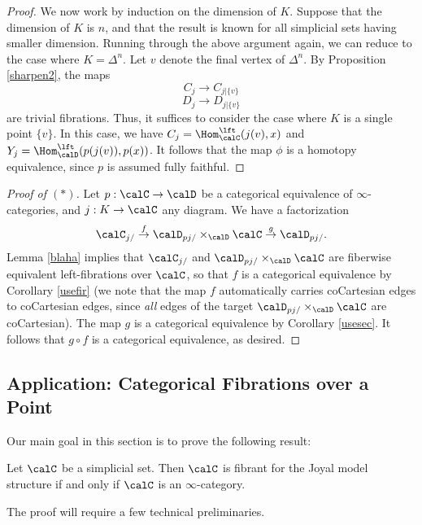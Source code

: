 \begin{proof}
We now work by induction on the dimension of $K$. Suppose that the dimension of $K$ is $n$, and that the result is known for all simplicial sets having smaller dimension. Running through the above argument again, we can reduce to the case where $K = \Delta^n$. Let $v$ denote the final vertex of $\Delta^n$. By Proposition \ref{sharpen2}, the maps
$$ C_{j} \rightarrow C_{ j| \{v\} }$$
$$ D_{j} \rightarrow D_{ j| \{v\} }$$
are trivial fibrations. Thus, it suffices to consider the case where $K$ is a single point $\{v\}$. 
In this case, we have $C_{j} = \Hom^{\lft}_{\calC}( j(v), x)$ and $Y_{j} = \Hom^{\lft}_{\calD}( p(j(v)), p(x))$.
It follows that the map $\phi$ is a homotopy equivalence, since $p$ is assumed fully faithful.
\end{proof}

\begin{proof}[Proof of $(\ast)$]
Let $p: \calC \rightarrow \calD$ be a categorical equivalence of $\infty$-categories, and $j: K \rightarrow \calC$ any diagram.
We have a factorization
$$ \calC_{j/} \stackrel{f}{\rightarrow} \calD_{p j/} \times_{\calD} \calC \stackrel{g}{\rightarrow} \calD_{pj/}.$$
Lemma \ref{blaha} implies that $\calC_{j/}$ and $\calD_{p j/} \times_{\calD} \calC$ are fiberwise equivalent left-fibrations over $\calC$, so that $f$ is a categorical equivalence by Corollary \ref{usefir} (we note that the map $f$
automatically carries coCartesian edges to coCartesian edges, since {\em all} edges of the target $\calD_{p j/} \times_{\calD} \calC$ are coCartesian). The map $g$ is a categorical equivalence by Corollary \ref{usesec}. It follows that $g \circ f$ is a categorical equivalence, as desired.
\end{proof} 

\subsection{Application: Categorical Fibrations over a Point}\label{slin}

Our main goal in this section is to prove the following result:

\begin{theorem}\label{joyalcharacterization}
Let $\calC$ be a simplicial set. Then $\calC$ is fibrant for the Joyal model structure if and only if $\calC$ is an $\infty$-category.
\end{theorem}

The proof will require a few technical preliminaries.

